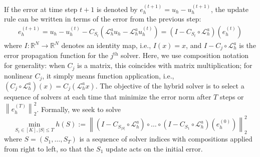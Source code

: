 \documentclass{article} %
\begin{document}

If the error at time step $t + 1$ is denoted by $e^{(t + 1)}_h = u_h - u^{\left(t + 1\right)}_h$, the update rule can be written in terms of the error from the previous step:
\begin{align*}
    e^{(t + 1)}_h = u_h -  u^{\left(t\right)}_h -C_{S_t}\left(\mathcal{L}_h^au_h - \mathcal{L}_h^au^{\left(t\right)}_h\right) = \left(I- C_{S_t} \circ \mathcal{L}_h^a\right)(e^{(t)}_h)
\end{align*}
where $I : \mathbb{R}^N \to \mathbb{R}^N$ denotes an identity map, i.e., $I(x) = x$, and $I - C_{j} \circ\mathcal{L}_h^a$ is the error propagation function for the $j^{\text{th}}$ solver. Here, we use composition notation for generality: when $C_{j}$ is a matrix, this coincides with matrix multiplication; for nonlinear $C_j$, it simply means function application, i.e., $(C_j \circ \mathcal{L}_h^a)(x) = C_j\left(\mathcal{L}_h^ax\right)$.
The objective of the hybrid solver is to select a sequence of solvers at each time that minimize the error norm after $T$ steps or $\left\|e^{(T)}_h\right\|_2^2$. Formally, we seek to solve 
\begin{equation} \label{eq:errorobjective}
    \min_{S_t \in [K], |S| \leq T} h(S) := \left\|\left(I - C_{S_{|S|}} \circ \mathcal{L}_h^a\right) \circ \dots \circ \left(I - C_{S_1} \circ \mathcal{L}_h^a\right)  \left(e^{(0)}_h \right)\right\|^2_2
\end{equation}
where $S = (S_1, \dots, S_T)$ is a sequence of solver indices 
with compositions applied from right to left, so that the $S_1$ update acts on the initial error.
\end{document}
